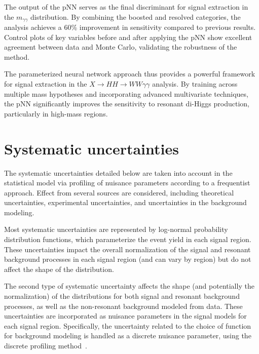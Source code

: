The output of the pNN serves as the final discriminant for signal extraction in the \(m_{\gamma\gamma}\) distribution. By combining the boosted and resolved categories, the analysis achieves a 60\% improvement in sensitivity compared to previous results. Control plots of key variables before and after applying the pNN show excellent agreement between data and Monte Carlo, validating the robustness of the method.

The parameterized neural network approach thus provides a powerful framework for signal extraction in the \(X \to HH \to WW\gamma\gamma\) analysis. By training across multiple mass hypotheses and incorporating advanced multivariate techniques, the pNN significantly improves the sensitivity to resonant di-Higgs production, particularly in high-mass regions.

\section{Systematic uncertainties}
\label{section:Systematics}
The systematic uncertainties detailed below are taken into account in the statistical model via profiling of nuisance parameters according to a frequentist approach.
Effect from several sources are considered, including theoretical uncertainties, experimental uncertainties, and uncertainties in the background modeling.

Most systematic uncertainties are represented by log-normal probability distribution functions, which parameterize the event yield in each signal region. These uncertainties impact the overall normalization of the signal and resonant background processes in each signal region (and can vary by region) but do not affect the shape of the \mgg distribution.

The second type of systematic uncertainty affects the shape (and potentially the normalization) of the \mgg distributions for both signal and resonant background processes, as well as the non-resonant background modeled from data. These uncertainties are incorporated as nuisance parameters in the signal models for each signal region.
Specifically, the uncertainty related to the choice of function for background modeling is handled as a discrete nuisance parameter, using the discrete profiling method~\cite{Dauncey:2014xga}.

